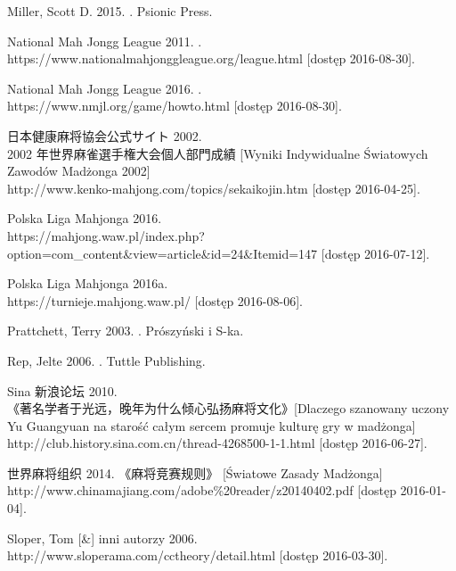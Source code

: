 Miller, Scott D. 2015. . Psionic Press.

National Mah Jongg League 2011. .
\\https://www.nationalmahjonggleague.org/league.html [dostęp 2016-08-30].

National Mah Jongg League 2016. .
\\https://www.nmjl.org/game/howto.html [dostęp 2016-08-30].

 日本健康麻将協会公式サイト  2002.
\\ 2002
年世界麻雀選手権大会個人部門成績 [Wyniki Indywidualne Światowych Zawodów Madżonga 2002]
\\http://www.kenko-mahjong.com/topics/sekaikojin.htm [dostęp 2016-04-25].

Polska Liga Mahjonga 2016. 
\\
https://mahjong.waw.pl/index.php?option=com\_content\&view=article\&id=24\&Itemid=147
[dostęp 2016-07-12].

Polska Liga Mahjonga 2016a.  \\https://turnieje.mahjong.waw.pl/ [dostęp 2016-08-06].

Prattchett, Terry 2003. . Prószyński i S-ka.

Rep, Jelte 2006. .
Tuttle Publishing. %

Sina  新浪论坛 2010.  \\
《著名学者于光远，晚年为什么倾心弘扬麻将文化》[Dlaczego szanowany uczony Yu Guangyuan na
starość całym sercem promuje kulturę gry w madżonga]
\\http://club.history.sina.com.cn/thread-4268500-1-1.html [dostęp 2016-06-27].

 世界麻将组织 2014. 《麻将竞赛规则》 [Światowe Zasady Madżonga]
\\http://www.chinamajiang.com/adobe\%20reader/z20140402.pdf [dostęp 2016-01-04].

Sloper, Tom [\&] inni autorzy 2006. 
\\http://www.sloperama.com/cctheory/detail.html [dostęp
2016-03-30].

